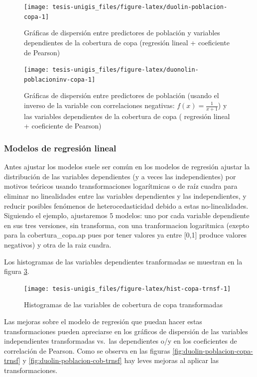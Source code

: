 \documentclass[12pt,]{book}
\begin{document}
\begin{figure}
\texttt{[image: tesis-unigis\_files/figure-latex/duolin-poblacion-copa-1]} \caption{Gráficas de dispersión entre predictores de población y variables dependientes de la cobertura de copa (regresión lineal + coeficiente de Pearson)}\label{fig:duolin-poblacion-copa}
\end{figure}

\begin{figure}
\texttt{[image: tesis-unigis\_files/figure-latex/duonolin-poblacioninv-copa-1]} \caption{Gráficas de dispersión entre predictores de población (usando el inverso de la variable con correlaciones negativas: $f(x)=\frac{1}{x+1}$) y las variables dependientes de la cobertura de copa ( regresión lineal  + coeficiente de Pearson)}\label{fig:duonolin-poblacioninv-copa}
\end{figure}

\subsubsection{Modelos de regresión
lineal}\label{modelos-de-regresion-lineal}

Antes ajustar los modelos suele ser común en los modelos de regresión
ajustar la distribución de las variables dependientes (y a veces las
independientes) por motivos teóricos usando transformaciones
logarítmicas o de raíz cuadra para eliminar no linealidades entre las
variables dependientes y las independientes, y reducir posibles
fenómenos de heterocedasticidad debido a estas no-linealidades.
Siguiendo el ejemplo, ajustaremos 5 modelos: uno por cada variable
dependiente en sus tres versiones, sin transforma, con una tranformacion
logaritmica (exepto para la cobertura\_copa.ap pues por tener valores ya
entre {[}0,1{]} produce valores negativos) y otra de la raiz cuadra.

Los histogramas de las variables dependientes tranformadas se muestran
en la figura \ref{fig:hist-copa-trnsf}.

\begin{figure}
\texttt{[image: tesis-unigis\_files/figure-latex/hist-copa-trnsf-1]} \caption{Histogramas de las variables de cobertura de copa transformadas}\label{fig:hist-copa-trnsf}
\end{figure}

Las mejoras sobre el modelo de regresión que puedan hacer estas
transformaciones pueden apreciarse en los gráficos de dispersión de las
variables independientes transformadas vs.~las dependientes o/y en los
coeficientes de correlación de Pearson. Como se observa en las figuras
\ref{fig:duolin-poblacion-copa-trnsf} y
\ref{fig:duolin-poblacion-cob-trnsf} hay leves mejoras al aplicar las
transformaciones.
\end{document}
